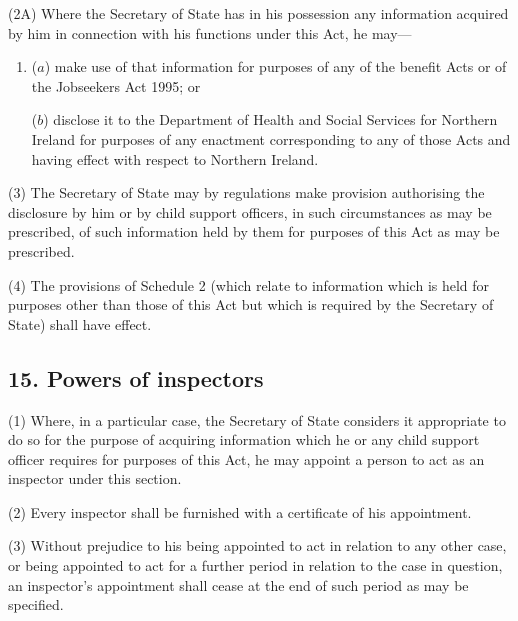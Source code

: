 \documentclass[12pt,a4paper]{article}
\begin{document}
(2A) Where the Secretary of State has in his possession any information acquired by him in connection with his functions under this Act, he may—
\begin{enumerate}\item[]
($a$) make use of that information for purposes of any of the benefit Acts or of the Jobseekers Act 1995; or

($b$) disclose it to the Department of Health and Social Services for Northern Ireland for purposes of any enactment corresponding to any of those Acts and having effect with respect to Northern Ireland.
\end{enumerate}

(3) The Secretary of State may by regulations make provision authorising the disclosure by him or by child support officers, in such circumstances as may be prescribed, of such information held by them for purposes of this Act as may be prescribed.

(4) The provisions of Schedule 2 (which relate to information which is held for purposes other than those of this Act but which is required by the Secretary of State) shall have effect.


\subsection{15. Powers of inspectors}

(1) Where, in a particular case, the Secretary of State considers it appropriate to do so for the purpose of acquiring information which he or any child support officer requires for purposes of this Act, he may appoint a person to act as an inspector under this section.

(2) Every inspector shall be furnished with a certificate of his appointment.

(3) Without prejudice to his being appointed to act in relation to any other case, or being appointed to act for a further period in relation to the case in question, an inspector’s appointment shall cease at the end of such period as may be specified.
\end{document}
